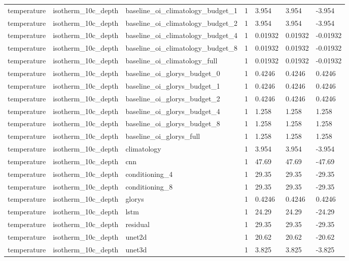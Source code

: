 \begin{table}[htbp]
\begin{tabular}{lllllll}
temperature & isotherm\_10c\_depth & baseline\_oi\_climatology\_budget\_1 & 1 & 3.954 & 3.954 & -3.954 \\
temperature & isotherm\_10c\_depth & baseline\_oi\_climatology\_budget\_2 & 1 & 3.954 & 3.954 & -3.954 \\
temperature & isotherm\_10c\_depth & baseline\_oi\_climatology\_budget\_4 & 1 & 0.01932 & 0.01932 & -0.01932 \\
temperature & isotherm\_10c\_depth & baseline\_oi\_climatology\_budget\_8 & 1 & 0.01932 & 0.01932 & -0.01932 \\
temperature & isotherm\_10c\_depth & baseline\_oi\_climatology\_full & 1 & 0.01932 & 0.01932 & -0.01932 \\
temperature & isotherm\_10c\_depth & baseline\_oi\_glorys\_budget\_0 & 1 & 0.4246 & 0.4246 & 0.4246 \\
temperature & isotherm\_10c\_depth & baseline\_oi\_glorys\_budget\_1 & 1 & 0.4246 & 0.4246 & 0.4246 \\
temperature & isotherm\_10c\_depth & baseline\_oi\_glorys\_budget\_2 & 1 & 0.4246 & 0.4246 & 0.4246 \\
temperature & isotherm\_10c\_depth & baseline\_oi\_glorys\_budget\_4 & 1 & 1.258 & 1.258 & 1.258 \\
temperature & isotherm\_10c\_depth & baseline\_oi\_glorys\_budget\_8 & 1 & 1.258 & 1.258 & 1.258 \\
temperature & isotherm\_10c\_depth & baseline\_oi\_glorys\_full & 1 & 1.258 & 1.258 & 1.258 \\
temperature & isotherm\_10c\_depth & climatology & 1 & 3.954 & 3.954 & -3.954 \\
temperature & isotherm\_10c\_depth & cnn & 1 & 47.69 & 47.69 & -47.69 \\
temperature & isotherm\_10c\_depth & conditioning\_4 & 1 & 29.35 & 29.35 & -29.35 \\
temperature & isotherm\_10c\_depth & conditioning\_8 & 1 & 29.35 & 29.35 & -29.35 \\
temperature & isotherm\_10c\_depth & glorys & 1 & 0.4246 & 0.4246 & 0.4246 \\
temperature & isotherm\_10c\_depth & lstm & 1 & 24.29 & 24.29 & -24.29 \\
temperature & isotherm\_10c\_depth & residual & 1 & 29.35 & 29.35 & -29.35 \\
temperature & isotherm\_10c\_depth & unet2d & 1 & 20.62 & 20.62 & -20.62 \\
temperature & isotherm\_10c\_depth & unet3d & 1 & 3.825 & 3.825 & -3.825 \\

\end{tabular}
\end{table}
